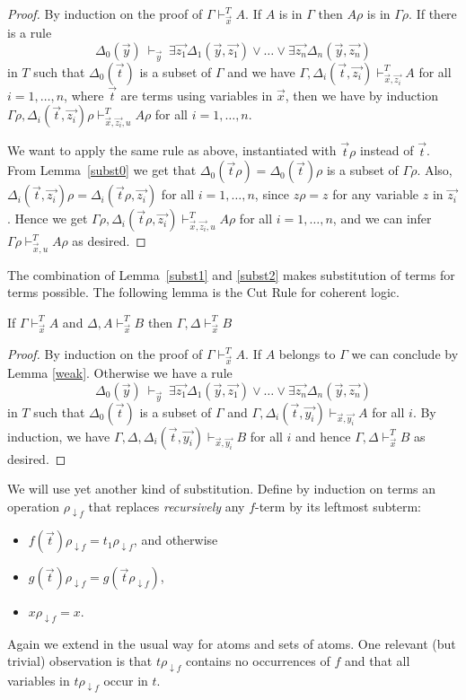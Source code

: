 \documentclass{fundam}
\newcommand{\ldf}[1]{#1\rho_{{\downarrow}f}}
\begin{document}
\begin{proof}
By induction on the proof of $\Gamma\vdash_{\vec{x}}^T A$.
If $A$ is in $\Gamma$ then $A\rho$ is in $\Gamma\rho$.
If there is a rule
$$
\Delta_0(\vec{y})~\vdash_{\vec{y}}~
\exists \vec{z_1}\Delta_1(\vec{y},\vec{z_1})\vee\dots\vee\exists \vec{z_n}\Delta_n(\vec{y},\vec{z_n})
$$
in $T$ such that $\Delta_0(\vec{t})$ is a subset of $\Gamma$ and
we have $\Gamma,\Delta_i(\vec{t},\vec{z_i})\vdash^T_{\vec{x},\vec{z_i}} A$ for all $i = 1,\dots,n$,
where $\vec{t}$ are terms using variables in $\vec{x}$, then we have by induction
$\Gamma\rho,\Delta_i(\vec{t},\vec{z_i})\rho\vdash^T_{\vec{x},\vec{z_i},u} A\rho$
for all $i = 1,\dots,n$. 

We want to apply the same rule as above, instantiated
with $\vec{t}\rho$ instead of $\vec{t}$. From Lemma~\ref{subst0} we get that
$\Delta_0(\vec{t}\rho) = \Delta_0(\vec{t})\rho$ is a subset of $\Gamma\rho$.
Also, $\Delta_i(\vec{t},\vec{z_i})\rho = \Delta_i(\vec{t}\rho,\vec{z_i})$ 
for all $i = 1,\dots,n$, since $z\rho = z$ for any variable $z$ in $\vec{z_i}$.
Hence we get
$\Gamma\rho,\Delta_i(\vec{t}\rho,\vec{z_i})\vdash^T_{\vec{x},\vec{z_i},u} A\rho$ for all $i = 1,\dots,n$,
and we can infer $\Gamma\rho\vdash^T_{\vec{x},u} A\rho$ as desired.
\end{proof}

The combination of Lemma~\ref{subst1} and \ref{subst2} makes
substitution of terms for terms possible. The following lemma is the Cut Rule
for coherent logic.

\begin{lemma}\label{cut}
If $\Gamma\vdash_{\vec{x}}^T A$ and $\Delta,A\vdash_{\vec{x}}^T B$ then
$\Gamma,\Delta\vdash_{\vec{x}}^T B$
\end{lemma}

\begin{proof}
By induction on the proof of $\Gamma\vdash_{\vec{x}}^T A$. If $A$ belongs to $\Gamma$ we can
conclude by Lemma \ref{weak}. 
Otherwise we have a rule
$$
\Delta_0(\vec{y})~\vdash_{\vec{y}}~
\exists \vec{z_1}\Delta_1(\vec{y},\vec{z_1})\vee\dots\vee\exists \vec{z_n}\Delta_n(\vec{y},\vec{z_n})
$$
in $T$ such that $\Delta_0(\vec{t})$ is a subset of $\Gamma$ and
$\Gamma,\Delta_i(\vec{t},\vec{y_i})\vdash_{\vec{x},\vec{y_i}} A$ for all $i$.
By induction, we have $\Gamma,\Delta,\Delta_i(\vec{t},\vec{y_i})\vdash_{\vec{x},\vec{y_i}} B$ for all $i$
and hence $\Gamma,\Delta\vdash_{\vec{x}}^T B$ as desired.
\end{proof}

We will use yet another kind of substitution. Define by induction on terms an operation
$\ldf{}$ that replaces \emph{recursively} any $f$-term by its leftmost subterm:
\begin{itemize}
\item $\ldf{f(\vec{t})} = \ldf{t_1}$, and otherwise
\item $\ldf{g(\vec{t})} = g(\ldf{\vec{t}})$,
\item $\ldf{x} = x$.
\end{itemize}
Again we extend in the usual way for atoms and sets of atoms.
One relevant (but trivial) observation is that $\ldf{t}$ contains no occurrences of $f$
and that all variables in $\ldf{t}$ occur in $t$.
\end{document}
